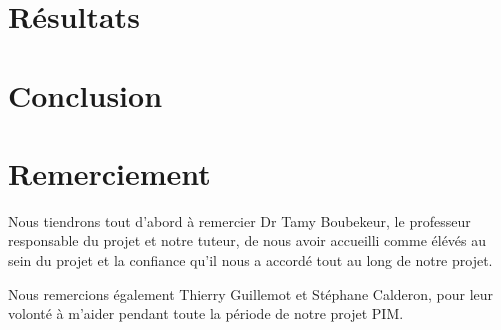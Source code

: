 \documentclass[a4paper,10pt]{article}
\begin{document}
\section{Résultats}

\section{Conclusion}

\section{Remerciement}
Nous tiendrons tout d’abord à remercier Dr Tamy Boubekeur, le professeur responsable du projet et notre tuteur, de nous avoir accueilli comme élévés au sein du projet et la confiance qu’il nous a accordé tout au long de notre projet.

Nous remercions également Thierry Guillemot et Stéphane Calderon, pour leur volonté à m’aider pendant toute la période de notre projet PIM.

\nocite{Beeler:2010:HSC:1778765.1778777}
\nocite{Beeler:2011:HPF:2010324.1964970}

\begin{small}
  
\end{small}
\section*{}
\end{document}
